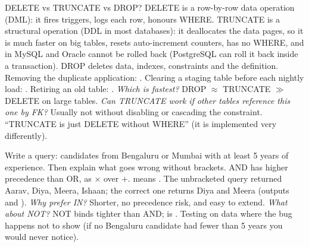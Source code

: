 \begin{qa}{\classic DELETE vs TRUNCATE vs DROP?}
\why DELETE is a row-by-row data operation (DML): it fires triggers, logs each row, honours WHERE. TRUNCATE is a structural operation (DDL in most
databases): it deallocates the data pages, so it is much faster on big tables, resets auto-increment counters, has no WHERE, and in MySQL and Oracle
cannot be rolled back (PostgreSQL can roll it back inside a transaction). DROP deletes data, indexes, constraints and the definition.
\worked Removing the duplicate application: . Clearing a staging table before each nightly load:
. Retiring an old table: .
\pushes \emph{Which is fastest?} DROP $\approx$ TRUNCATE $\gg$ DELETE on large tables. \emph{Can TRUNCATE work if other tables reference this one by
FK?} Usually not without disabling or cascading the constraint.
\pitfall ``TRUNCATE is just DELETE without WHERE'' (it is implemented very differently).
\end{qa}

\begin{qa}{Write a query: candidates from Bengaluru or Mumbai with at least 5 years of experience. Then explain what goes wrong without brackets.}
\why AND has higher precedence than OR, as $\times$ over $+$.  means .
\worked The unbracketed query returned Aarav, Diya, Meera, Ishaan; the correct one returns Diya and Meera (outputs  and
).
\pushes \emph{Why prefer IN?} Shorter, no precedence risk, and easy to extend. \emph{What about NOT?} NOT binds tighter than AND;  is
.
\pitfall Testing on data where the bug happens not to show (if no Bengaluru candidate had fewer than 5 years you would never notice).
\end{qa}

